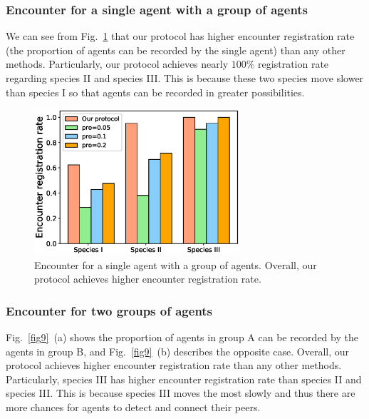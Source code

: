\subsubsection{Encounter for a single 
agent with a group of agents}

We can see from Fig.~\ref{fig8} that 
our protocol has higher encounter
registration rate (the proportion of agents can 
be recorded by the single agent) than any other methods.
Particularly, our protocol achieves nearly $100\%$ registration
rate regarding species II and species III.
This is because these two species move slower than species I 
so that agents can be recorded in greater possibilities. 


\begin{figure}[!h]
    \centering
    \includegraphics[width=3in]{figures/figure8.eps}
    \caption{Encounter for a single 
    agent with a group of agents. Overall, our protocol
    achieves higher encounter registration rate.}
    \label{fig8}
\end{figure}

\subsubsection{Encounter for two groups of agents}

Fig.~\ref{fig9}~(a) shows the proportion of agents in group A can 
be recorded by the agents in group B, and Fig.~\ref{fig9}~(b) describes
the opposite case. Overall, our protocol achieves higher encounter 
registration rate than any other methods. Particularly, species III
has higher encounter registration rate than species II and species III.
This is because species III moves the most slowly and thus there are more 
chances for agents to detect and connect their peers. 

